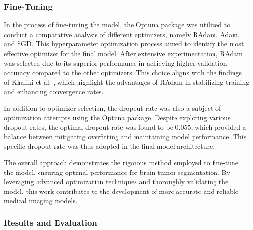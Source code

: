 \subsubsection{Fine-Tuning}

In the process of fine-tuning the model, the Optuna package was utilized to conduct a comparative analysis of different optimizers, namely RAdam, Adam, and SGD. This hyperparameter optimization process aimed to identify the most effective optimizer for the final model. After extensive experimentation, RAdam was selected due to its superior performance in achieving higher validation accuracy compared to the other optimizers. This choice aligns with the findings of Khaliki et al. \cite{khaliki_brain_2024}, which highlight the advantages of RAdam in stabilizing training and enhancing convergence rates.

In addition to optimizer selection, the dropout rate was also a subject of optimization attempts using the Optuna package. Despite exploring various dropout rates, the optimal dropout rate was found to be 0.055, which provided a balance between mitigating overfitting and maintaining model performance. This specific dropout rate was thus adopted in the final model architecture.

The overall approach demonstrates the rigorous method employed to fine-tune the model, ensuring optimal performance for brain tumor segmentation. By leveraging advanced optimization techniques and thoroughly validating the model, this work contributes to the development of more accurate and reliable medical imaging models.

\subsubsection{Results and Evaluation}

